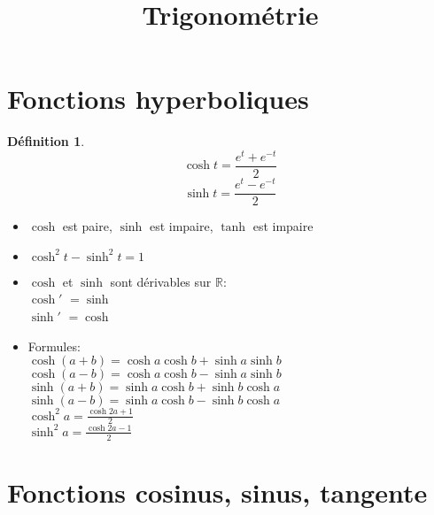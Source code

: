 \documentclass[fleqn]{article}
\title{Trigonom\'etrie}
\date{}
\theoremstyle{definition} \newtheorem*{defi}{D\'efinition}
\theoremstyle{definition} \newtheorem*{theo}{Th\'eor\`eme}
\begin{document}
\maketitle

\section{Fonctions hyperboliques}
\begin{defi} $\ $
		\[ \cosh t = \frac{e^t + e^{-t}}{2} \]
		\[ \sinh t = \frac{e^t - e^{-t}}{2} \]
\end{defi}

\begin{itemize}
	\item $\cosh$ est paire, $\sinh$ est impaire, $\tanh$ est impaire
	\item $ \cosh^2 t - \sinh^2 t = 1 $
	\item $\cosh$ et $\sinh$ sont d\'{e}rivables sur $\mathbb{R}$: \\
		$\cosh'$ $ = \sinh$ \\
		$\sinh'$ $ = \cosh$
	\item Formules: \\
		$\cosh (a+b) = \cosh a\cosh b + \sinh a\sinh b$ \\
		$\cosh (a-b) = \cosh a\cosh b - \sinh a\sinh b$ \\
		$\sinh (a+b) = \sinh a\cosh b + \sinh b\cosh a$ \\
		$\sinh (a-b) = \sinh a\cosh b - \sinh b\cosh a$ \\
		$\cosh^2 a = \frac{\cosh 2a + 1}{2}$ \\
		$\sinh^2 a = \frac{\cosh 2a - 1}{2}$
\end{itemize}

\section{Fonctions cosinus, sinus, tangente}
\end{document}
